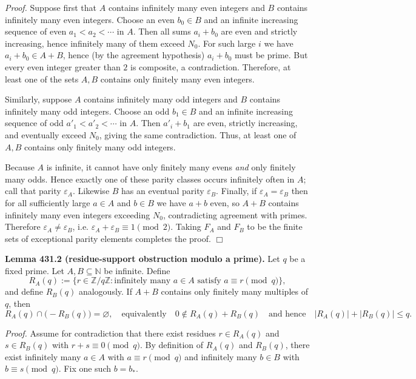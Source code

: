 \noindent\emph{Proof.}
Suppose first that $A$ contains infinitely many even integers and $B$ contains infinitely many even integers. Choose an even $b_0\in B$ and an infinite increasing sequence of even $a_1<a_2<\cdots$ in $A$. Then all sums $a_i+b_0$ are even and strictly increasing, hence infinitely many of them exceed $N_0$. For such large $i$ we have $a_i+b_0\in A+B$, hence (by the agreement hypothesis) $a_i+b_0$ must be prime. But every even integer greater than $2$ is composite, a contradiction. Therefore, at least one of the sets $A,B$ contains only finitely many even integers.

Similarly, suppose $A$ contains infinitely many odd integers and $B$ contains infinitely many odd integers. Choose an odd $b_1\in B$ and an infinite increasing sequence of odd $a'_1<a'_2<\cdots$ in $A$. Then $a'_i+b_1$ are even, strictly increasing, and eventually exceed $N_0$, giving the same contradiction. Thus, at least one of $A,B$ contains only finitely many odd integers.

Because $A$ is infinite, it cannot have only finitely many evens \emph{and} only finitely many odds. Hence exactly one of these parity classes occurs infinitely often in $A$; call that parity $\varepsilon_A$. Likewise $B$ has an eventual parity $\varepsilon_B$. Finally, if $\varepsilon_A=\varepsilon_B$ then for all sufficiently large $a\in A$ and $b\in B$ we have $a+b$ even, so $A+B$ contains infinitely many even integers exceeding $N_0$, contradicting agreement with primes. Therefore $\varepsilon_A\ne\varepsilon_B$, i.e. $\varepsilon_A+\varepsilon_B\equiv 1\pmod 2$. Taking $F_A$ and $F_B$ to be the finite sets of exceptional parity elements completes the proof. \hfill$\Box$

\medskip
\noindent\textbf{Lemma 431.2 (residue-support obstruction modulo a prime).}
Let $q$ be a fixed prime. Let $A,B\subseteq\mathbb N$ be infinite. Define
\[
R_A(q):=\{r\in\mathbb Z/q\mathbb Z : \text{infinitely many }a\in A\text{ satisfy }a\equiv r\pmod q\},
\]
and define $R_B(q)$ analogously. If $A+B$ contains only finitely many multiples of $q$, then
\[
R_A(q)\cap\bigl(-R_B(q)\bigr)=\varnothing,
\quad\text{equivalently}\quad 0\notin R_A(q)+R_B(q)
\quad\text{and hence}\quad |R_A(q)|+|R_B(q)|\le q.
\]

\noindent\emph{Proof.}
Assume for contradiction that there exist residues $r\in R_A(q)$ and $s\in R_B(q)$ with $r+s\equiv 0\pmod q$. By definition of $R_A(q)$ and $R_B(q)$, there exist infinitely many $a\in A$ with $a\equiv r\pmod q$ and infinitely many $b\in B$ with $b\equiv s\pmod q$. Fix one such $b=b_*$.

